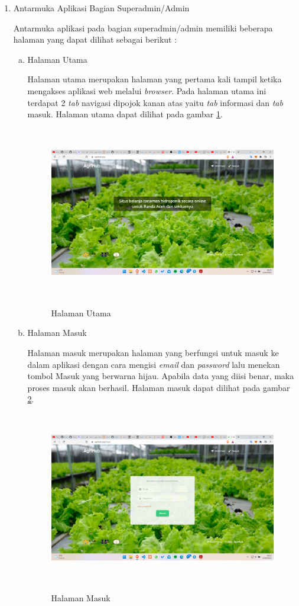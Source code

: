 \begin{enumerate}
	\item Antarmuka Aplikasi Bagian Superadmin/Admin
	
	Antarmuka aplikasi pada bagian superadmin/admin memiliki beberapa halaman yang dapat dilihat sebagai berikut :

	\newpage
	\begin{enumerate}[a.]
		\item Halaman Utama
		\par Halaman utama merupakan halaman yang pertama kali tampil ketika mengakses aplikasi web melalui \textit{browser}. Pada halaman utama ini terdapat 2 \textit{tab} navigasi dipojok kanan atas yaitu \textit{tab} informasi dan \textit{tab} masuk. Halaman utama dapat dilihat pada gambar \ref*{homepage}.
		\begin{figure}[H]
			\centering
			{\includegraphics [width = 13cm, height= 7.5cm]{gambar/homepage}}
			\caption{Halaman Utama}
			\label{homepage}
		\end{figure}

		\item Halaman Masuk
		\par Halaman masuk merupakan halaman yang berfungsi untuk masuk ke dalam aplikasi dengan cara mengisi \textit{email} dan \textit{password} lalu menekan tombol Masuk yang berwarna hijau. Apabila data yang diisi benar, maka proses masuk akan berhasil. Halaman masuk dapat dilihat pada gambar \ref*{login}.
		\begin{figure}[H]
			\centering
			{\includegraphics [width = 13cm, height= 7.5cm]{gambar/login}}
			\caption{Halaman Masuk}
			\label{login}
		\end{figure}
	

\end{enumerate}
\end{enumerate}
